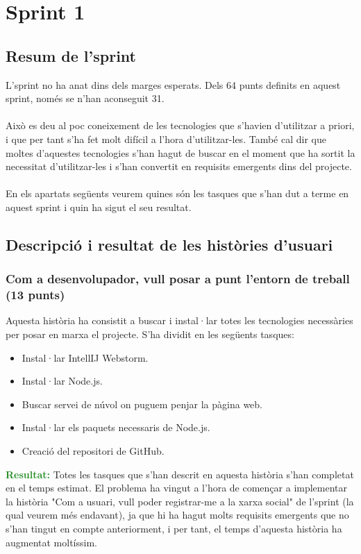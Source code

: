 \documentclass[11pt,catalan,listoffigures,listoftables]{tfgetsinf}
\begin{document}
\section{Sprint 1}

\subsection{Resum de l'sprint}

L'sprint no ha anat dins dels marges esperats. Dels 64 punts definits en aquest sprint, només se n'han aconseguit 31.\\ \\
Això es deu al poc coneixement de les tecnologies que s'havien d'utilitzar a priori, i que per tant s'ha fet molt difícil a l'hora d'utilitzar-les. També cal dir que moltes d'aquestes tecnologies s'han hagut de buscar en el moment que ha sortit la necessitat d'utilitzar-les i s'han convertit en requisits emergents dins del projecte.\\ \\
En els apartats següents veurem quines són les tasques que s'han dut a terme en aquest sprint i quin ha sigut el seu resultat.

\subsection{Descripció i resultat de les històries d'usuari}

\subsubsection{Com a desenvolupador, vull posar a punt l'entorn de treball (13 punts)}

Aquesta història ha consistit a buscar i instal·lar totes les tecnologies necessàries per posar en marxa el projecte. S'ha dividit en les següents tasques:
\begin{itemize}
\item Instal·lar IntellIJ Webstorm.
\item Instal·lar Node.js.
\item Buscar servei de núvol on puguem penjar la pàgina web.
\item Instal·lar els paquets necessaris de Node.js.
\item Creació del repositori de GitHub.
\end{itemize}
\textcolor{forestgreen}{\textbf{Resultat:}} Totes les tasques que s'han descrit en aquesta història s'han completat en el temps estimat. El problema ha vingut a l'hora de començar a implementar la història "Com a usuari, vull poder registrar-me a la xarxa social" de l'sprint (la qual veurem més endavant), ja que hi ha hagut molts requisits emergents que no s'han tingut en compte anteriorment, i per tant, el temps d'aquesta història ha augmentat moltíssim.
\end{document}
